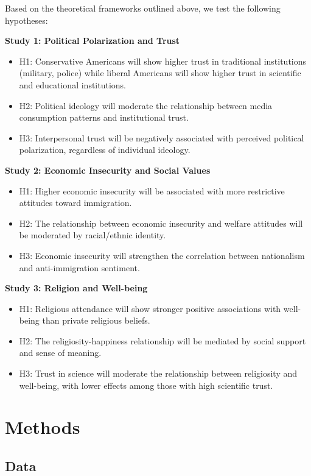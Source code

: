 \documentclass[12pt,a4paper]{article}
\begin{document}
Based on the theoretical frameworks outlined above, we test the following hypotheses:

\textbf{Study 1: Political Polarization and Trust}
\begin{itemize}
\item H1: Conservative Americans will show higher trust in traditional institutions 
(military, police) while liberal Americans will show higher trust in scientific 
and educational institutions.
\item H2: Political ideology will moderate the relationship between media consumption 
patterns and institutional trust.
\item H3: Interpersonal trust will be negatively associated with perceived political 
polarization, regardless of individual ideology.
\end{itemize}

\textbf{Study 2: Economic Insecurity and Social Values}
\begin{itemize}
\item H1: Higher economic insecurity will be associated with more restrictive 
attitudes toward immigration.
\item H2: The relationship between economic insecurity and welfare attitudes will 
be moderated by racial/ethnic identity.
\item H3: Economic insecurity will strengthen the correlation between nationalism 
and anti-immigration sentiment.
\end{itemize}

\textbf{Study 3: Religion and Well-being}
\begin{itemize}
\item H1: Religious attendance will show stronger positive associations with 
well-being than private religious beliefs.
\item H2: The religiosity-happiness relationship will be mediated by social support 
and sense of meaning.
\item H3: Trust in science will moderate the relationship between religiosity and 
well-being, with lower effects among those with high scientific trust.
\end{itemize}

\section{Methods}

\subsection{Data}
\end{document}
